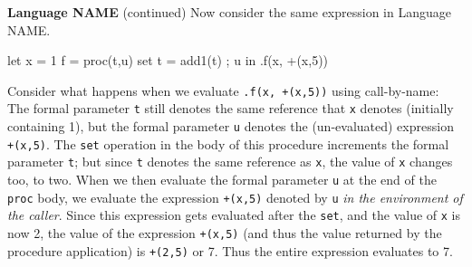 \begin{minipage}[t]{\sw}
\slidenumber
\LARGE
{\bf Language {\color{red} NAME}} (continued)\exx
Now consider the same expression in Language NAME.
\Large
\begin{qv}
let
  x = 1
  f = proc(t,u)
        { set t = add1(t) ; u }
in
  .f(x, +(x,5))
\end{qv}
\LARGE
Consider what happens when we evaluate \verb'.f(x, +(x,5))'
using call-by-name:
The formal parameter \verb't' still denotes 
the same reference that \verb'x' denotes (initially containing 1),
but the formal parameter \verb'u' denotes
the (un-evaluated) expression \verb'+(x,5)'.\exx
The \verb'set' operation in the body of this procedure
increments the formal parameter \verb't';
but since \verb't' denotes the same reference as \verb'x',
the value of \verb'x' changes too, to two.
When we then evaluate the formal parameter \verb'u'
at the end of the \verb'proc' body,
we evaluate the expression \verb'+(x,5)' denoted by \verb'u'
{\em in the environment of the caller}.
Since this expression gets evaluated after the \verb'set',
and the value of \verb'x' is now 2,
the value of the expression \verb'+(x,5)'
(and thus the value returned by the procedure application)
is \verb'+(2,5)' or 7.
Thus the entire expression evaluates to 7.
\end{minipage}
\clearpage
